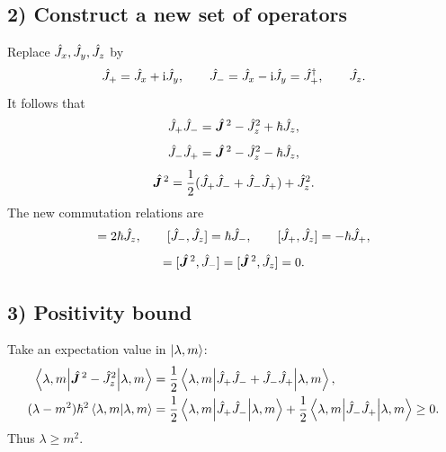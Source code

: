 \subsection*{2) Construct a new set of operators}
Replace $\hat{J}_x,\hat{J}_y,\hat{J}_z$ by
\begin{equation}
\hat{J}_+=\hat{J}_x+\mathrm{i}\hat{J}_y,\qquad
\hat{J}_-=\hat{J}_x-\mathrm{i}\hat{J}_y=\hat{J}_+^\dagger,\qquad\hat{J}_z.
\end{equation}
It follows that
\begin{equation}
\hat{J}_+\hat{J}_-=\hat{\bm{J}}^{\,2}-\hat{J}_z^2+\hbar\hat{J}_z,
\end{equation}
\begin{equation}
\hat{J}_-\hat{J}_+=\hat{\bm{J}}^{\,2}-\hat{J}_z^2-\hbar\hat{J}_z,
\end{equation}
\begin{equation}
\hat{\bm{J}}^{\,2}=\frac12(\hat{J}_+\hat{J}_-+\hat{J}_-\hat{J}_+)+\hat{J}_z^2.
\end{equation}
The new commutation relations are
\begin{equation}
[\op J_+,\op J_-]=2\hbar\op J_z,\qquad
[\op J_-,\op J_z]=\hbar\op J_-,\qquad
[\op J_+,\op J_z]=-\hbar\op J_+,
\end{equation}
\begin{equation}
[\op{\vect J}^{\,2},\op J_+]=[\op{\vect J}^{\,2},\op J_-]
=[\op{\vect J}^{\,2},\op J_z]=0.
\end{equation}

\subsection*{3) Positivity bound}
Take an expectation value in $\left|\lambda,m\right\rangle$:
\begin{equation}\begin{aligned}
\left\langle\lambda,m\middle|\hat{\bm{J}}^{\,2}-\hat{J}_z^2\middle|\lambda,m\right\rangle
&=\frac12\left\langle\lambda,m\middle|\hat{J}_+\hat{J}_-+\hat{J}_-\hat{J}_+\middle|\lambda,m\right\rangle,\\
(\lambda-m^2)\hbar^2\left\langle\lambda,m\middle|\lambda,m\right\rangle
&=\frac12\left\langle\lambda,m\middle|\hat{J}_+\hat{J}_-\middle|\lambda,m\right\rangle
+\frac12\left\langle\lambda,m\middle|\hat{J}_-\hat{J}_+\middle|\lambda,m\right\rangle\ge0.
\end{aligned}\end{equation}
Thus $\lambda\ge m^2$.


